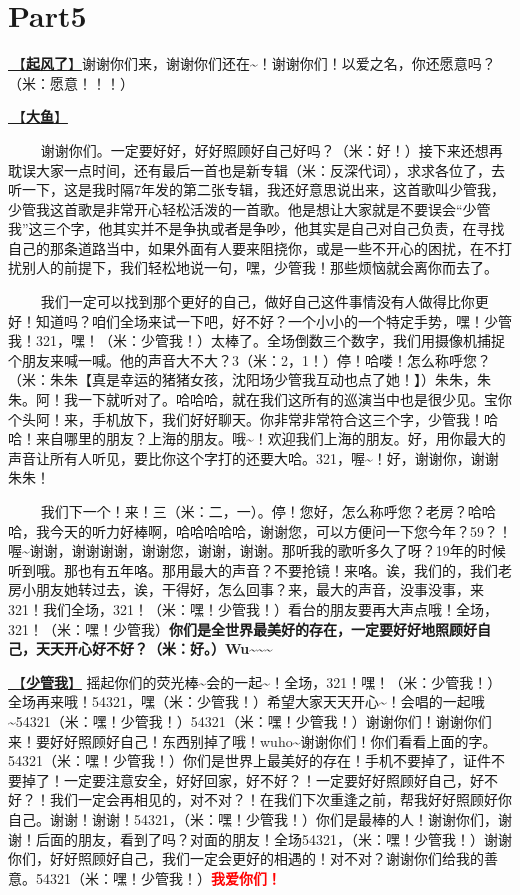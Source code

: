 \documentclass[]{ctexbook}
\begin{document}
\section{Part5}\label{suzhou-20241110-part5}

\hyperref[the-wind-rises]{🎵【\textbf{起风了}】}谢谢你们来，谢谢你们还在\textasciitilde！谢谢你们！以爱之名，你还愿意吗？（米：愿意！！！）

\hyperref[big-fish]{🎵【\textbf{大鱼}】}

   谢谢你们。一定要好好，好好照顾好自己好吗？（米：好！）接下来还想再耽误大家一点时间，还有最后一首也是新专辑（米：反深代词），求求各位了，去听一下，这是我时隔7年发的第二张专辑，我还好意思说出来，这首歌叫少管我，少管我这首歌是非常开心轻松活泼的一首歌。他是想让大家就是不要误会``少管我''这三个字，他其实并不是争执或者是争吵，他其实是自己对自己负责，在寻找自己的那条道路当中，如果外面有人要来阻挠你，或是一些不开心的困扰，在不打扰别人的前提下，我们轻松地说一句，嘿，少管我！那些烦恼就会离你而去了。

   我们一定可以找到那个更好的自己，做好自己这件事情没有人做得比你更好！知道吗？咱们全场来试一下吧，好不好？一个小小的一个特定手势，嘿！少管我！321，嘿！（米：少管我！）太棒了。全场倒数三个数字，我们用摄像机捕捉个朋友来喊一喊。他的声音大不大？3（米：2，1！）停！哈喽！怎么称呼您？（米：朱朱【真是幸运的猪猪女孩，沈阳场少管我互动也点了她！】）朱朱，朱朱。阿！我一下就听对了。哈哈哈，就在我们这所有的巡演当中也是很少见。宝你个头阿！来，手机放下，我们好好聊天。你非常非常符合这三个字，少管我！哈哈！来自哪里的朋友？上海的朋友。哦\textasciitilde！欢迎我们上海的朋友。好，用你最大的声音让所有人听见，要比你这个字打的还要大哈。321，喔\textasciitilde！好，谢谢你，谢谢朱朱！

   我们下一个！来！三（米：二，一）。停！您好，怎么称呼您？老房？哈哈哈，我今天的听力好棒啊，哈哈哈哈哈，谢谢您，可以方便问一下您今年？59？！喔\textasciitilde 谢谢，谢谢谢谢，谢谢您，谢谢，谢谢。那听我的歌听多久了呀？19年的时候听到哦。那也有五年咯。那用最大的声音？不要抢镜！来咯。诶，我们的，我们老房小朋友她转过去，诶，干得好，怎么回事？来，最大的声音，没事没事，来321！我们全场，321！（米：嘿！少管我！）看台的朋友要再大声点哦！全场，321！（米：嘿！少管我）\textbf{你们是全世界最美好的存在，一定要好好地照顾好自己，天天开心好不好？（米：好。）Wu\textasciitilde\textasciitilde\textasciitilde{}}

\hyperref[watch-ur-manners]{🎵【\textbf{少管我}】} 摇起你们的荧光棒\textasciitilde 会的一起\textasciitilde！全场，321！嘿！（米：少管我！）全场再来哦！54321，嘿（米：少管我！）希望大家天天开心\textasciitilde！会唱的一起哦\textasciitilde54321（米：嘿！少管我！）54321（米：嘿！少管我！）谢谢你们！谢谢你们来！要好好照顾好自己！东西别掉了哦！wuho\textasciitilde 谢谢你们！你们看看上面的字。54321（米：嘿！少管我！）你们是世界上最美好的存在！手机不要掉了，证件不要掉了！一定要注意安全，好好回家，好不好？！一定要好好照顾好自己，好不好？！我们一定会再相见的，对不对？！在我们下次重逢之前，帮我好好照顾好你自己。谢谢！谢谢！54321，（米：嘿！少管我！）你们是最棒的人！谢谢你们，谢谢！后面的朋友，看到了吗？对面的朋友！全场54321，（米：嘿！少管我！）谢谢你们，好好照顾好自己，我们一定会更好的相遇的！对不对？谢谢你们给我的善意。54321（米：嘿！少管我！）\textbf{\textcolor{red}{我爱你们！}}
\end{document}
